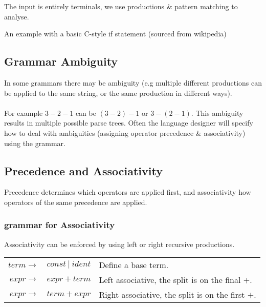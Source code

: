 \documentclass{report}
\begin{document}
The input is entirely terminals, we use productions \& pattern matching to analyse.
\centerline{An example with a basic C-style if statement (sourced from wikipedia)}


\subsection*{Grammar Ambiguity}
In some grammars there may be ambiguity (e.g multiple different productions can be applied to the same string, or the same production in different ways).
\\
\\ For example $3 - 2 - 1$ can be $(3 - 2) - 1$ or $3  - (2 - 1)$. This ambiguity results in multiple possible parse trees.
Often the language designer will specify how to deal with ambiguities (assigning operator precedence \& associativity) using the grammar.

\subsection*{Precedence and Associativity}
Precedence determines which operators are applied first, and associativity how operators of the same precedence are applied.

\subsubsection*{grammar for Associativity}
Associativity can be enforced by using left or right recursive productions.
\begin{center}
	\begin{tabular}{r l l}
		$term \to$ & $const \ | \ ident$ & Define a base term.                               \\
		$expr \to$ & $expr + term$       & Left associative, the split is on the final $+$.  \\
		$expr \to$ & $term + expr$       & Right associative, the split is on the first $+$. \\
	\end{tabular}
\end{center}
\end{document}
